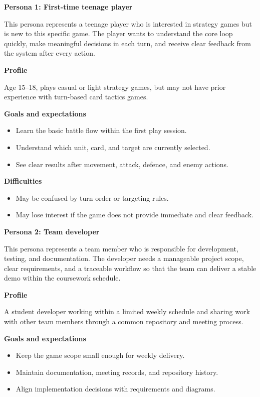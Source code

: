 \documentclass[12pt,a4paper]{report}
\begin{document}
\textbf{Persona 1: First-time teenage player}

This persona represents a teenage player who is interested in strategy games but is new to this specific game. The player wants to understand the core loop quickly, make meaningful decisions in each turn, and receive clear feedback from the system after every action.

\textbf{Profile}

Age 15--18, plays casual or light strategy games, but may not have prior experience with turn-based card tactics games.

\textbf{Goals and expectations}

\begin{itemize}
\item Learn the basic battle flow within the first play session.
\item Understand which unit, card, and target are currently selected.
\item See clear results after movement, attack, defence, and enemy actions.
\end{itemize}

\textbf{Difficulties}

\begin{itemize}
\item May be confused by turn order or targeting rules.
\item May lose interest if the game does not provide immediate and clear feedback.
\end{itemize}

\textbf{Persona 2: Team developer}

This persona represents a team member who is responsible for development, testing, and documentation. The developer needs a manageable project scope, clear requirements, and a traceable workflow so that the team can deliver a stable demo within the coursework schedule.

\textbf{Profile}

A student developer working within a limited weekly schedule and sharing work with other team members through a common repository and meeting process.

\textbf{Goals and expectations}

\begin{itemize}
\item Keep the game scope small enough for weekly delivery.
\item Maintain documentation, meeting records, and repository history.
\item Align implementation decisions with requirements and diagrams.
\end{itemize}
\end{document}
